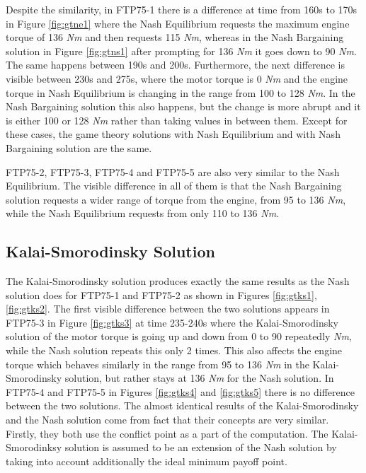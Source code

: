 Despite the similarity, in FTP75-1 there is a difference at time from 160s to 170s in Figure \ref{fig:gtne1} where the Nash Equilibrium requests the maximum engine torque of 136 \textit{Nm} and then requests 115 \textit{Nm}, whereas in the Nash Bargaining solution in Figure \ref{fig:gtns1} after prompting for 136 \textit{Nm} it goes down to 90 \textit{Nm}. The same happens between 190s and 200s. Furthermore, the next difference is visible between 230s and 275s, where the motor torque is 0 \textit{Nm} and the engine torque in Nash Equilibrium is changing in the range from 100 to 128 \textit{Nm}. In the Nash Bargaining solution this also happens, but the change is more abrupt and it is either 100 or 128 \textit{Nm} rather than taking values in between them. Except for these cases, the game theory solutions with Nash Equilibrium and with Nash Bargaining solution are the same.

FTP75-2, FTP75-3, FTP75-4 and FTP75-5 are also very similar to the Nash Equilibrium. The visible difference in all of them is that the Nash Bargaining solution requests a wider range of torque from the engine, from 95 to 136 \textit{Nm}, while the Nash Equilibrium requests from only 110 to 136 \textit{Nm}.

\subsection{Kalai-Smorodinsky Solution}
The Kalai-Smorodinsky solution produces exactly the same results as the Nash solution does for FTP75-1 and FTP75-2 as shown in Figures \ref{fig:gtks1}, \ref{fig:gtks2}. The first visible difference between the two solutions appears in FTP75-3 in Figure \ref{fig:gtks3} at time 235-240s where the Kalai-Smorodinsky solution of the motor torque is going up and down from 0 to 90 repeatedly \textit{Nm}, while the Nash solution repeats this only 2 times. This also affects the engine torque which behaves similarly in the range from 95 to 136 \textit{Nm} in the Kalai-Smorodinsky solution, but rather stays at 136 \textit{Nm} for the Nash solution. In FTP75-4 and FTP75-5 in Figures \ref{fig:gtks4} and \ref{fig:gtks5} there is no difference between the two solutions. The almost identical results of the Kalai-Smorodinsky and the Nash solution come from fact that their concepts are very similar. Firstly, they both use the conflict point as a part of the computation. The Kalai-Smorodinksy solution is assumed to be an extension of the Nash solution by taking into account additionally the ideal minimum payoff point.

